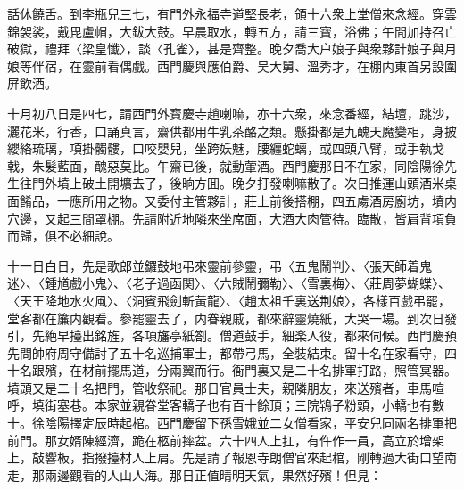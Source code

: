 話休饒舌。到李瓶兒三七，有門外永福寺道堅長老，領十六衆上堂僧來念經。穿雲錦袈裟，戴毘盧帽，大鈸大鼓。早晨取水，轉五方，請三寳，浴佛；午間加持召亡破獄，禮拜〈梁皇懺〉，談〈孔雀〉，甚是齊整。晚夕喬大户娘子與衆夥計娘子與月娘等伴宿，在靈前看偶戲。西門慶與應伯爵、吴大舅、溫秀才，在棚内東首另設圍屏飲酒。

十月初八日是四七，請西門外寳慶寺趙喇嘛，亦十六衆，來念番經，結壇，跳沙，灑花米，行香，口誦真言，齋供都用牛乳茶酪之類。懸掛都是九醜天魔變相，身披纓絡琉璃，項掛髑髏，口咬嬰兒，坐跨妖魅，腰纏蛇螭，或四頭八臂，或手執戈戟，朱髮藍面，醜惡莫比。午齋已後，就動葷酒。西門慶那日不在家，同陰陽徐先生往門外墳上破土開壙去了，後晌方囬。晚夕打發喇嘛散了。次日推運山頭酒米桌面餚品，一應所用之物。又委付主管夥計，莊上前後搭棚，四五䖏酒房廚坊，墳内穴邊，又起三間罩棚。先請附近地隣來坐席面，大酒大肉管待。臨散，皆肩背項負而歸，俱不必細說。

十一日白日，先是歌郎並鑼鼓地弔來靈前參靈，弔〈五鬼鬧判〉、〈張天師着鬼迷〉、〈鍾馗戲小鬼〉、〈老子過函関〉、〈六賊鬧彌勒〉、〈雪裏梅〉、〈莊周夢蝴蝶〉、〈天王降地水火風〉、〈洞賓飛劍斬黃龍〉、〈趙太祖千裏送荆娘〉，各樣百戲弔罷，堂客都在簾内觀看。參罷靈去了，内眷親戚，都來辭靈燒紙，大哭一場。到次日發引，先絶早擡出銘旌，各項旛亭紙劄。僧道鼓手，細楽人役，都來伺候。西門慶預先問帥府周守備討了五十名巡捕軍士，都帶弓馬，全裝結束。留十名在家看守，四十名跟殯，在材前擺馬道，分兩翼而行。衙門裏又是二十名排軍打路，照管冥器。墳頭又是二十名把門，管收祭祀。那日官員士夫，親隣朋友，來送殯者，車馬喧呼，填街塞巷。本家並親眷堂客轎子也有百十餘頂；三院鴇子粉頭，小轎也有數十。徐陰陽擇定辰時起棺。西門慶留下孫雪娥並二女僧看家，平安兒同兩名排軍把前門。那女婿陳經濟，跪在柩前摔盆。六十四人上扛，有仵作一員，高立於增架上，敲響板，指撥擡材人上肩。先是請了報恩寺朗僧官來起棺，剛轉過大街口望南走，那兩邊觀看的人山人海。那日正值晴明天氣，果然好殯！但見：

